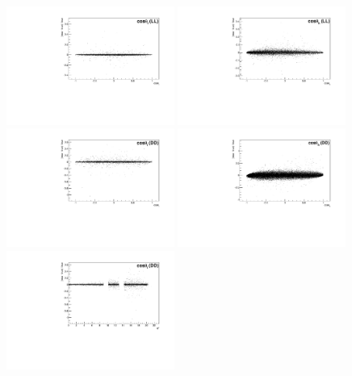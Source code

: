 \begin{figure}
\centering
\includegraphics[width=0.49\textwidth]{Lmumu/figs/resolution/RmT_vs_cosThetaL_LL.pdf}
\includegraphics[width=0.49\textwidth]{Lmumu/figs/resolution/RmT_vs_cosThetaB_LL.pdf}
\includegraphics[width=0.49\textwidth]{Lmumu/figs/resolution/RmT_vs_cosThetaL_DD.pdf}
\includegraphics[width=0.49\textwidth]{Lmumu/figs/resolution/RmT_vs_cosThetaB_DD.pdf}
\includegraphics[width=0.49\textwidth]{Lmumu/figs/resolution/RmTcosThetaL_vs_q2_DD.pdf}

\end{figure}
